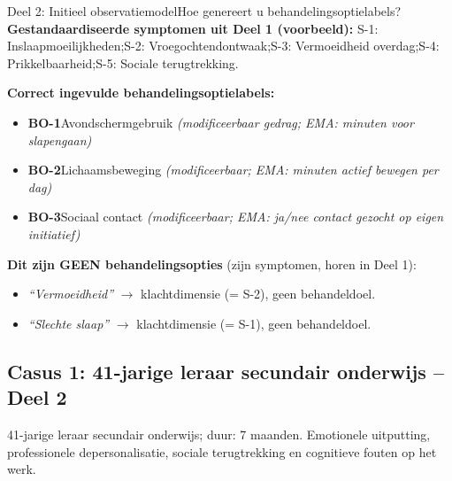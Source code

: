\documentclass[11pt,a4paper]{article}
\begin{document}
\vspace{0.5em}
\nopagebreak[4]

\begin{voorbeeldbox}{Deel 2: Initieel observatiemodel}{Hoe genereert u behandelingsoptielabels?}
\small
\textbf{Gestandaardiseerde symptomen uit Deel 1 (voorbeeld):}
S-1: Inslaapmoeilijkheden;\enspace S-2: Vroegochtendontwaak;\enspace S-3: Vermoeidheid overdag;\enspace S-4: Prikkelbaarheid;\enspace S-5: Sociale terugtrekking.

\medskip
\textbf{Correct ingevulde behandelingsoptielabels:}
\begin{itemize}[topsep=2pt,itemsep=1pt]
\item \textbf{BO-1}\enspace Avondschermgebruik
  \hfill\textit{(modificeerbaar gedrag; EMA: minuten voor slapengaan)}
\item \textbf{BO-2}\enspace Lichaamsbeweging
  \hfill\textit{(modificeerbaar; EMA: minuten actief bewegen per dag)}
\item \textbf{BO-3}\enspace Sociaal contact
  \hfill\textit{(modificeerbaar; EMA: ja/nee contact gezocht op eigen initiatief)}
\end{itemize}

\medskip
\textbf{\color{StrongRed}Dit zijn GEEN behandelingsopties} (zijn symptomen, horen in Deel 1):
\begin{itemize}[topsep=1pt,itemsep=0pt]
\item \textit{``Vermoeidheid''} $\rightarrow$ klachtdimensie (= S-2), geen behandeldoel.
\item \textit{``Slechte slaap''} $\rightarrow$ klachtdimensie (= S-1), geen behandeldoel.
\end{itemize}
\end{voorbeeldbox}

\vspace{0.5em}

\newpage
\subsection*{Casus 1: 41-jarige leraar secundair onderwijs -- Deel 2}

\begin{complaintbox}[title={Casus 1: verkorte klachtomschrijving}]
\small 41-jarige leraar secundair onderwijs; duur: 7 maanden. Emotionele uitputting, professionele depersonalisatie, sociale terugtrekking en cognitieve fouten op het werk.
\end{complaintbox}
\end{document}
